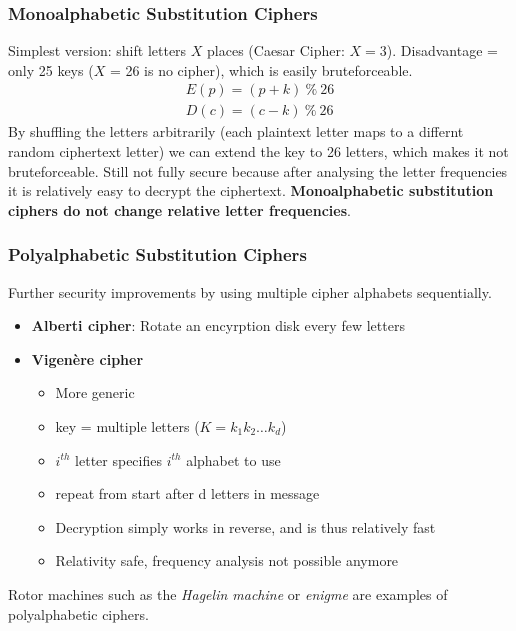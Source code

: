 \documentclass[11pt,british,faculty=ea,layout=titlefont,underline=false,titleUppercase=true,titleUnderline=true,hidelinks]{ugent2016-report}
\begin{document}
			\subsubsection{Monoalphabetic Substitution Ciphers} \label{subsub:monoalphabetic-substitution-ciphers}
				Simplest version: shift letters $X$ places (Caesar Cipher: $X=3$). Disadvantage = only 25 keys ($X$ = 26 is no cipher), which is easily bruteforceable.
				\begin{align*}
					E(p) = (p + k)\ \%\ 26 \\
					D(c) = (c - k)\ \%\ 26
				\end{align*}
				By shuffling the letters arbitrarily (each plaintext letter maps to a differnt random ciphertext letter) we can extend the key to 26 letters, which makes it not bruteforceable.
				Still not fully secure because after analysing the letter frequencies it is relatively easy to decrypt the ciphertext.
				\textbf{Monoalphabetic substitution ciphers do not change relative letter frequencies}.

			\subsubsection{Polyalphabetic Substitution Ciphers} \label{subsub:polyalphabetic-substitution-ciphers}
				Further security improvements by using multiple cipher alphabets sequentially.
				\begin{itemize}
					\item \textbf{Alberti cipher}: Rotate an encyrption disk every few letters
					\item \textbf{Vigenère cipher}
					\begin{itemize}
						\item More generic
						\item key = multiple letters ($K = k_1 k_2 \dots k_d$)
						\item $i^{th}$ letter specifies $i^{th}$ alphabet to use
						\item repeat from start after d letters in message
						\item Decryption simply works in reverse, and is thus relatively fast
						\item Relativity safe, frequency analysis not possible anymore
					\end{itemize}
				\end{itemize}
				Rotor machines such as the \textit{Hagelin machine} or \textit{enigme} are examples of polyalphabetic ciphers.
\end{document}
